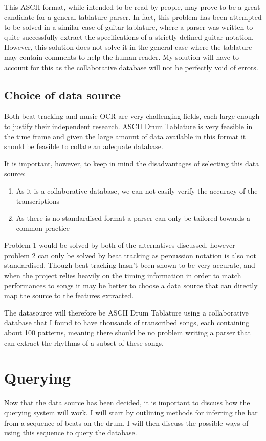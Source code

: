 \documentclass[12pt,twoside,notitlepage]{report}
\begin{document}
				This ASCII format, while intended to be read by people, may prove to be a great candidate for a general tablature parser. In fact, this problem has been attempted to be solved in a similar case of guitar tablature\cite{Knowles2013}, where a parser was written to quite successfully extract the specifications of a strictly defined guitar notation. However, this solution does not solve it in the general case where the tablature may contain comments to help the human reader. My solution will have to account for this as the collaborative database will not be perfectly void of errors.
		\subsection{\label{subsec:ChoiceOfDataSource}Choice of data source}
		Both beat tracking and music OCR are very challenging fields, each large enough to justify their independent research. ASCII Drum Tablature is very feasible in the time frame and given the large amount of data available in this format it should be feasible to collate an adequate database.
		
		It is important, however, to keep in mind the disadvantages of selecting this data source:
		\begin{enumerate}
			\item{As it is a collaborative database, we can not easily verify the accuracy of the transcriptions}
			\item{As there is no standardised format a parser can only be tailored towards a common practice}
		\end{enumerate}
		
		Problem 1 would be solved by both of the alternatives discussed, however problem 2 can only be solved by beat tracking as percussion notation is also not standardised. Though beat tracking hasn't been shown to be very accurate, and when the project relies heavily on the timing information in order to match performances to songs it may be better to choose a data source that can directly map the source to the features extracted.
		
		The datasource will therefore be ASCII Drum Tablature using a collaborative database that I found to have thousands of transcribed songs, each containing about 100 patterns, meaning there should be no problem writing a parser that can extract the rhythms of a subset of these songs.		
		

	\section{Querying}
	Now that the data source has been decided, it is important to discuss how the querying system will work. I will start by outlining methods for inferring the bar from a sequence of beats on the drum. I will then discuss the possible ways of using this sequence to query the database.
	
\end{document}
